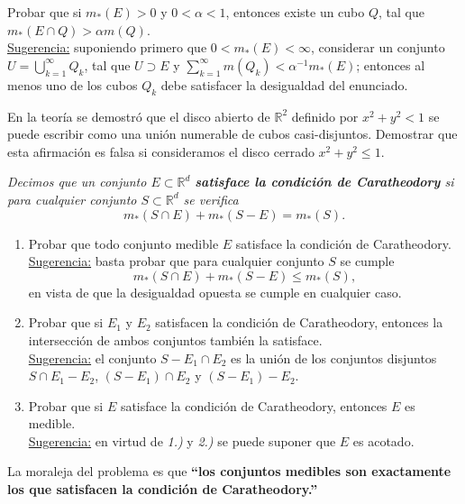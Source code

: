 \documentclass{book}
\newcommand{\rr}{\mathbb{R}}
\newcommand{\di}{\displaystyle}
\begin{document}
  \begin{ejer}{} 
	Probar que si $m_*(E)>0$ y $0<\alpha<1$, entonces existe un cubo $Q$, tal que
  $m_*(E\cap Q)>\alpha m(Q)$.
\\
  \underline{Sugerencia:} suponiendo primero que $0<m_*(E)<\infty$, considerar un conjunto
 $U=\di\bigcup_{k=1}^{\infty}Q_k$, tal que 
  $U\supset E$ y $\sum\limits_{k=1}^{\infty}m(Q_k)<\alpha^{-1} m_*(E)$; entonces al menos uno de los cubos $Q_k$
  debe satisfacer la desigualdad del enunciado.
 \end{ejer} 

\begin{ejer}{}
  En la teoría se demostró que el disco abierto  de $\rr^2$ definido por  $x^2+y^2< 1$ se puede escribir como una unión numerable de cubos casi-disjuntos. Demostrar que esta afirmación es falsa si consideramos el disco cerrado  $x^2+y^2\leq 1$.  
	\end{ejer}






  \begin{ejer} {} 
	{\it{Decimos que un conjunto $E\subset \rr^d$ 
  {\bf{satisface la condición de Caratheodory}}
  si para cualquier conjunto $S\subset \rr^d$ se verifica}} 
  $$m_*(S\cap E)+m_*(S-E)=m_*(S). $$
	\begin{enumerate}   
    \item Probar que todo conjunto medible $E$ satisface la condición de Caratheodory.
    \\
    \underline{Sugerencia:} basta probar que para cualquier conjunto $S$ se cumple
    $$m_*(S\cap E)+m_*(S-E)\leq m_*(S), $$
    en vista de que la desigualdad opuesta se cumple en cualquier caso.
 
    \item Probar que si $E_1$ y $E_2$ satisfacen la condición de Caratheodory, 
    entonces la intersección de ambos conjuntos también la satisface.
    \\
    \underline{Sugerencia:} el conjunto $S-E_1\cap E_2$ es la unión de los conjuntos 
    disjuntos $S\cap E_1-E_2$, $(S-E_1)\cap E_2$ y $(S-E_1)-E_2$.

    \item Probar que si $E$ satisface la condición de Caratheodory, entonces $E$ es medible.
    \\
    \underline{Sugerencia:} en virtud de {\it{1.)}} y {\it{2.)}} se puede suponer que $E$ es acotado.
	\end{enumerate}
    La moraleja del problema es que 
    {\bf{``los conjuntos medibles son exactamente los que satisfacen
    la condición de Caratheodory.''}}
  \end{ejer} 
	
\end{document}
